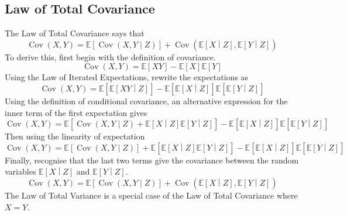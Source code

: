 \documentclass[11pt]{report} %
\begin{document}
\subsection{Law of Total Covariance}
The Law of Total Covariance says that
\begin{equation}
\operatorname{Cov}\left(X, Y\right) = \mathbb{E}\left[\operatorname{Cov}\left(X, Y\middle|Z\right)\right] + \operatorname{Cov}\left(\mathbb{E}\left[X\middle|Z\right],\mathbb{E}\left[Y\middle|Z\right]\right)
\end{equation}
To derive this, first begin with the definition of covariance.
\begin{equation}
\operatorname{Cov}\left(X, Y\right) = \mathbb{E}\left[XY\right] - \mathbb{E}\left[X\right]\mathbb{E}\left[Y\right]
\end{equation}
Using the Law of Iterated Expectations, rewrite the expectations as
\begin{equation}
\operatorname{Cov}\left(X, Y\right) = \mathbb{E}\left[\mathbb{E}\left[XY\middle|Z\right]\right] - \mathbb{E}\left[\mathbb{E}\left[X\middle|Z\right]\right]\mathbb{E}\left[\mathbb{E}\left[Y\middle|Z\right]\right]
\end{equation}
Using the definition of conditional covariance, an alternative expression for the inner term of the first expectation gives
\begin{equation}
\operatorname{Cov}\left(X, Y\right) = \mathbb{E}\left[\operatorname{Cov}\left(X, Y\middle| Z\right) + \mathbb{E}\left[X\middle|Z\right]\mathbb{E}\left[Y\middle|Z\right]\right] - \mathbb{E}\left[\mathbb{E}\left[X\middle|Z\right]\right]\mathbb{E}\left[\mathbb{E}\left[Y\middle|Z\right]\right]
\end{equation}
Then using the linearity of expectation
\begin{equation}
\operatorname{Cov}\left(X, Y\right) = \mathbb{E}\left[\operatorname{Cov}\left(X, Y\middle| Z\right)\right] + \mathbb{E}\left[\mathbb{E}\left[X\middle|Z\right]\mathbb{E}\left[Y\middle|Z\right]\right] - \mathbb{E}\left[\mathbb{E}\left[X\middle|Z\right]\right]\mathbb{E}\left[\mathbb{E}\left[Y\middle|Z\right]\right]
\end{equation}
Finally, recognise that the last two terms give the covariance between the random variables $\mathbb{E}\left[X\middle|Z\right]$ and $\mathbb{E}\left[Y\middle|Z\right]$.
\begin{equation}
\operatorname{Cov}\left(X, Y\right) = \mathbb{E}\left[\operatorname{Cov}\left(X, Y\middle|Z\right)\right] + \operatorname{Cov}\left(\mathbb{E}\left[X\middle|Z\right], \mathbb{E}\left[Y\middle|Z\right]\right)
\end{equation}
The Law of Total Variance is a special case of the Law of Total Covariance where $X = Y$.
\end{document}
